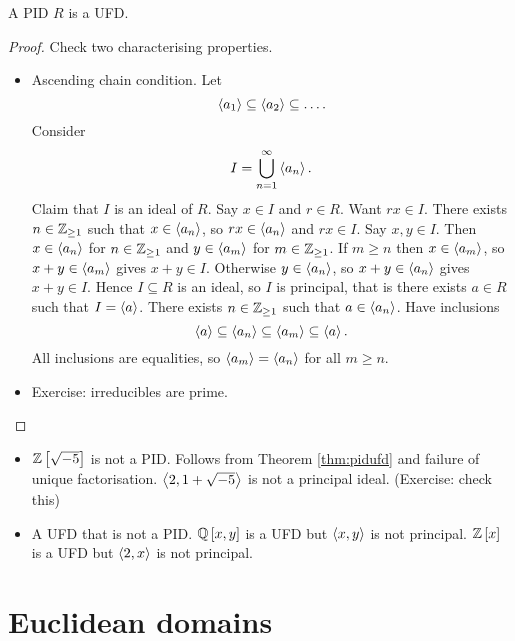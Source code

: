 \begin{theorem}
\label{thm:pidufd}
A PID $ R $ is a UFD.
\end{theorem}

\begin{proof}
Check two characterising properties.
\begin{itemize}
\item Ascending chain condition. Let
$$ \left\langle a_1 \right\rangle \subseteq \left\langle a_2 \right\rangle \subseteq \dots. $$
Consider
$$ I = \bigcup_{n = 1}^\infty \left\langle a_n \right\rangle. $$
Claim that $ I $ is an ideal of $ R $. Say $ x \in I $ and $ r \in R $. Want $ rx \in I $. There exists $ n \in \mathbb{Z}_{\ge 1} $ such that $ x \in \left\langle a_n \right\rangle $, so $ rx \in \left\langle a_n \right\rangle $ and $ rx \in I $. Say $ x, y \in I $. Then $ x \in \left\langle a_n \right\rangle $ for $ n \in \mathbb{Z}_{\ge 1} $ and $ y \in \left\langle a_m \right\rangle $ for $ m \in \mathbb{Z}_{\ge 1} $. If $ m \ge n $ then $ x \in \left\langle a_m \right\rangle $, so $ x + y \in \left\langle a_m \right\rangle $ gives $ x + y \in I $. Otherwise $ y \in \left\langle a_n \right\rangle $, so $ x + y \in \left\langle a_n \right\rangle $ gives $ x + y \in I $. Hence $ I \subseteq R $ is an ideal, so $ I $ is principal, that is there exists $ a \in R $ such that $ I = \left\langle a \right\rangle $. There exists $ n \in \mathbb{Z}_{\ge 1} $ such that $ a \in \left\langle a_n \right\rangle $. Have inclusions
$$ \left\langle a \right\rangle \subseteq \left\langle a_n \right\rangle \subseteq \left\langle a_m \right\rangle \subseteq \left\langle a \right\rangle. $$
All inclusions are equalities, so $ \left\langle a_m \right\rangle = \left\langle a_n \right\rangle $ for all $ m \ge n $.
\item Exercise: irreducibles are prime.
\end{itemize}
\end{proof}

\begin{remark1}
\hfill
\begin{itemize}
\item $ \mathbb{Z}\left[ \sqrt{-5} \right] $ is not a PID. Follows from Theorem \ref{thm:pidufd} and failure of unique factorisation. $ \left\langle 2, 1 + \sqrt{-5} \right\rangle $ is not a principal ideal. (Exercise: check this)
\item A UFD that is not a PID. $ \mathbb{Q}\left[ x, y \right] $ is a UFD but $ \left\langle x, y \right\rangle $ is not principal. $ \mathbb{Z}\left[ x \right] $ is a UFD but $ \left\langle 2, x \right\rangle $ is not principal.
\end{itemize}
\end{remark1}

\pagebreak

\section{Euclidean domains}

